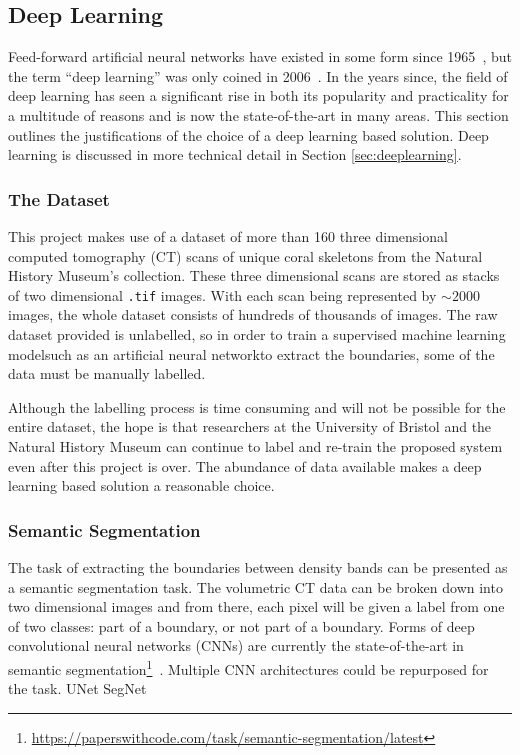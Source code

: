 \subsection{Deep Learning}

Feed-forward artificial neural networks have existed in some form since 1965~\cite{deepoverview, 1966cybernetic}, but the term ``deep learning'' was only coined in 2006~\cite{deepoverview, hintondeep, hintonfast}. In the years since, the field of deep learning has seen a significant rise in both its popularity and practicality for a multitude of reasons and is now the state-of-the-art in many areas. This section outlines the justifications of the choice of a deep learning based solution. Deep learning is discussed in more technical detail in Section \ref{sec:deeplearning}.

\subsubsection{The Dataset}

This project makes use of a dataset of more than 160 three dimensional computed tomography (CT) scans of unique coral skeletons from the Natural History Museum's collection. These three dimensional scans are stored as stacks of two dimensional \texttt{.tif} images. With each scan being represented by ${\sim}2000$ images, the whole dataset consists of hundreds of thousands of images. The raw dataset provided is unlabelled, so in order to train a supervised machine learning model\textemdash such as an artificial neural network\textemdash to extract the boundaries, some of the data must be manually labelled.

Although the labelling process is time consuming and will not be possible for the entire dataset, the hope is that researchers at the University of Bristol and the Natural History Museum can continue to label and re-train the proposed system even after this project is over. The abundance of data available makes a deep learning based solution a reasonable choice.

\subsubsection{Semantic Segmentation}

The task of extracting the boundaries between density bands can be presented as a semantic segmentation task. The volumetric CT data can be broken down into two dimensional images and from there, each pixel will be given a label from one of two classes: part of a boundary, or not part of a boundary. Forms of deep convolutional neural networks (CNNs) are currently the state-of-the-art in semantic segmentation\footnote{\url{https://paperswithcode.com/task/semantic-segmentation/latest}}~\cite{chen2018encoder, semanticseg-SOTA}. Multiple CNN architectures could be repurposed for the task. UNet SegNet

